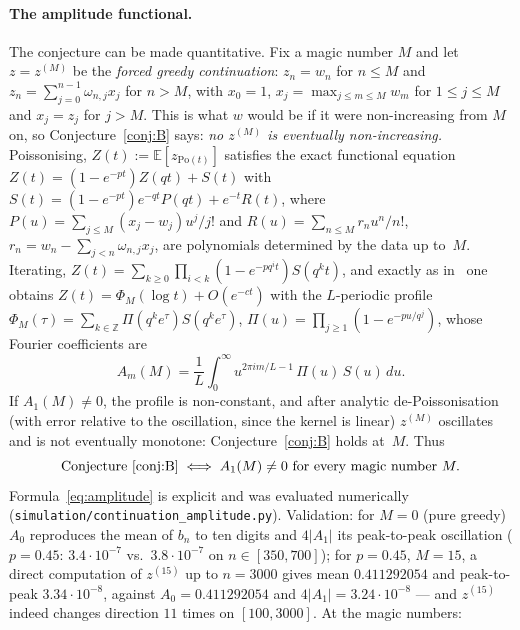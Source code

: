 \documentclass[11pt]{article}
\theoremstyle{definition}
\begin{document}
\paragraph{The amplitude functional.}  The conjecture can be made
quantitative.  Fix a magic number $M$ and let $z=z^{(M)}$ be the
\emph{forced greedy continuation}: $z_n=w_n$ for $n\le M$ and
$z_n=\sum_{j=0}^{n-1}\omega_{n,j}x_j$ for $n>M$, with $x_0=1$,
$x_j=\max_{j\le m\le M}w_m$ for $1\le j\le M$ and $x_j=z_j$ for $j>M$.
This is what $w$ would be if it were non-increasing from $M$ on, so
Conjecture~\ref{conj:B} says: \emph{no $z^{(M)}$ is eventually
non-increasing.}  Poissonising, $Z(t):=\mathbb E[z_{\mathrm{Po}(t)}]$
satisfies the exact functional equation
$Z(t)=(1-e^{-pt})Z(qt)+S(t)$ with
$S(t)=(1-e^{-pt})e^{-qt}P(qt)+e^{-t}R(t)$, where
$P(u)=\sum_{j\le M}(x_j-w_j)u^j/j!$ and $R(u)=\sum_{n\le M}r_nu^n/n!$,
$r_n=w_n-\sum_{j<n}\omega_{n,j}x_j$, are polynomials determined by the
data up to~$M$.  Iterating, $Z(t)=\sum_{k\ge0}\prod_{i<k}(1-e^{-pq^it})
S(q^kt)$, and exactly as in~\cite{Paper2} one obtains
$Z(t)=\Phi_M(\log t)+O(e^{-ct})$ with the $L$-periodic profile
$\Phi_M(\tau)=\sum_{k\in\mathbb Z}\Pi(q^ke^\tau)S(q^ke^\tau)$,
$\Pi(u)=\prod_{j\ge1}(1-e^{-pu/q^j})$, whose Fourier coefficients are
\begin{equation}\label{eq:amplitude}
  A_m(M)=\frac1L\int_0^\infty u^{2\pi im/L-1}\,\Pi(u)\,S(u)\,du .
\end{equation}
If $A_1(M)\ne0$, the profile is non-constant, and after analytic
de-Poissonisation (with error relative to the oscillation, since the
kernel is linear) $z^{(M)}$ oscillates and is not eventually monotone:
Conjecture~\ref{conj:B} holds at~$M$.  Thus
\[
  \text{Conjecture~\ref{conj:B}}\iff A_1(M)\ne0\ \text{for every magic
  number } M .
\]
Formula~\eqref{eq:amplitude} is explicit and was evaluated numerically
(\texttt{simulation/continuation\_amplitude.py}).  Validation: for
$M=0$ (pure greedy) $A_0$ reproduces the mean of $b_n$ to ten digits
and $4|A_1|$ its peak-to-peak oscillation ($p=0.45$: $3.4\cdot10^{-7}$
vs.\ $3.8\cdot10^{-7}$ on $n\in[350,700]$); for $p=0.45$, $M=15$, a
direct computation of $z^{(15)}$ up to $n=3000$ gives mean
$0.411292054$ and peak-to-peak $3.34\cdot10^{-8}$, against
$A_0=0.411292054$ and $4|A_1|=3.24\cdot10^{-8}$ --- and $z^{(15)}$
indeed changes direction $11$ times on $[100,3000]$.  At the magic
numbers:
\end{document}
